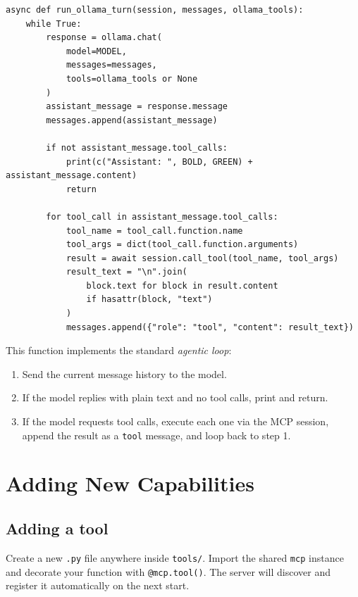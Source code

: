 \documentclass[11pt, a4paper]{article}
\begin{document}
\begin{lstlisting}[caption={run\_ollama\_turn}]
async def run_ollama_turn(session, messages, ollama_tools):
    while True:
        response = ollama.chat(
            model=MODEL,
            messages=messages,
            tools=ollama_tools or None
        )
        assistant_message = response.message
        messages.append(assistant_message)

        if not assistant_message.tool_calls:
            print(c("Assistant: ", BOLD, GREEN) + assistant_message.content)
            return

        for tool_call in assistant_message.tool_calls:
            tool_name = tool_call.function.name
            tool_args = dict(tool_call.function.arguments)
            result = await session.call_tool(tool_name, tool_args)
            result_text = "\n".join(
                block.text for block in result.content
                if hasattr(block, "text")
            )
            messages.append({"role": "tool", "content": result_text})
\end{lstlisting}

This function implements the standard \emph{agentic loop}:
\begin{enumerate}
  \item Send the current message history to the model.
  \item If the model replies with plain text and no tool calls, print and return.
  \item If the model requests tool calls, execute each one via the MCP session, append the result as a \texttt{tool} message, and loop back to step 1.
\end{enumerate}

\section{Adding New Capabilities}

\subsection{Adding a tool}

Create a new \texttt{.py} file anywhere inside \texttt{tools/}. Import the shared \lstinline{mcp} instance and decorate your function with \lstinline{@mcp.tool()}. The server will discover and register it automatically on the next start.
\end{document}
